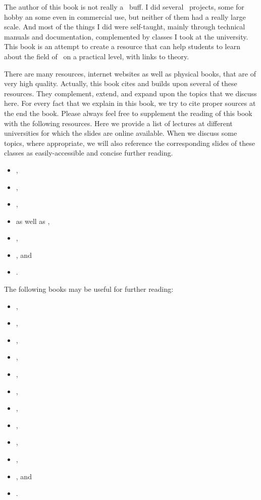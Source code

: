 %
\global\let\oldxyzglslink\glslink%
\protected\gdef\glslink#1#2{#2}%
%
The author of this book is not really a \db\ buff.
I did several \db\ projects, some for hobby an some even in commercial use, but neither of them had a really large scale.
And most of the things I did were self-taught, mainly through technical manuals and documentation, complemented by classes I took at the university.
This book is an attempt to create a resource that can help students to learn about the field of \dbs\ on a practical level, with links to theory.

There are many resources, internet websites as well as physical books, that are of very high quality.
Actually, this book cites and builds upon several of these resources.
They complement, extend, and expand upon the topics that we discuss here.
For every fact that we explain in this book, we try to cite proper sources at the end the book.
Please always feel free to supplement the reading of this book with the following resources.%
%
%
Here we provide a list of lectures at different universities for which the slides are online available.
When we discuss some topics, where appropriate, we will also reference the corresponding slides of these classes as easily-accessible and concise further reading.%
\begin{itemize}%
\item {},%
\item {},%
\item {},%
\item {} as well as ,%
\item {},%
\item {}, and%
\item {}.%
\end{itemize}%
\endhsection%
%
%
The following books may be useful for further reading:%
\begin{itemize}%
\item {},%
\item {},%
\item {},%
\item {},%
\item {},%
\item {},%
\item {},%
\item {},%
\item {},%
\item {},%
\item {}, and%
\item {}.%
\end{itemize}%

